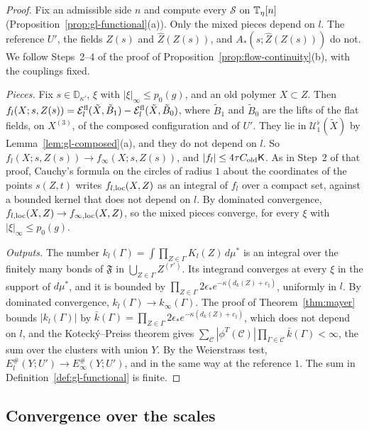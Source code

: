 \begin{proof}
Fix an admissible side $n$ and compute every $\mathscr S$ on $\mathbb T_\eta[n]$ (Proposition~\ref{prop:gl-functional}(a)). Only the mixed pieces depend on $l$. The reference $U'$, the fields $Z(s)$ and $\hat Z(Z(s))$, and $A_*(s;\hat Z(Z(s)))$ do not. We follow Steps~2--4 of the proof of Proposition~\ref{prop:flow-continuity}(b), with the couplings fixed.

\emph{Pieces.} Fix $s\in\mathbb D_{\kappa'}$, $\xi$ with $|\xi|_\infty\le p_0(g)$, and an old polymer $X\subset Z$. Then $f_l(X;s,Z(s))=\mathcal E^{\rm fl}_l(\tilde X,\tilde B_1)-\mathcal E^{\rm fl}_l(\tilde X,\tilde B_0)$, where $\tilde B_1$ and $\tilde B_0$ are the lifts of the flat fields, on $X^{(3)}$, of the composed configuration and of $U'$. They lie in $\mathcal U^\flat_1(\tilde X)$ by Lemma~\ref{lem:gl-composed}(a), and they do not depend on $l$. So $f_l(X;s,Z(s))\to f_\infty(X;s,Z(s))$, and $|f_l|\le4\tau C_{\rm old}\mathsf K$. As in Step~2 of that proof, Cauchy's formula on the circles of radius $1$ about the coordinates of the points $s(Z,t)$ writes $f_{l,\rm loc}(X,Z)$ as an integral of $f_l$ over a compact set, against a bounded kernel that does not depend on $l$. By dominated convergence, $f_{l,\rm loc}(X,Z)\to f_{\infty,\rm loc}(X,Z)$, so the mixed pieces converge, for every $\xi$ with $|\xi|_\infty\le p_0(g)$.

\emph{Outputs.} The number $k_l(\Gamma)=\int\prod_{Z\in\Gamma}K_l(Z)\,d\mu^*$ is an integral over the finitely many bonds of $\mathfrak F$ in $\bigcup_{Z\in\Gamma}Z^{(r')}$. Its integrand converges at every $\xi$ in the support of $d\mu^*$, and it is bounded by $\prod_{Z\in\Gamma}2\epsilon_*e^{-\kappa(d_k(Z)+c_\natural)}$, uniformly in $l$. By dominated convergence, $k_l(\Gamma)\to k_\infty(\Gamma)$. The proof of Theorem~\ref{thm:mayer} bounds $|k_l(\Gamma)|$ by $\bar k(\Gamma)=\prod_{Z\in\Gamma}2\epsilon_*e^{-\kappa(d_k(Z)+c_\natural)}$, which does not depend on $l$, and the Koteck\'y--Preiss theorem gives $\sum_{\mathcal C}|\phi^T(\mathcal C)|\prod_{\Gamma\in\mathcal C}\bar k(\Gamma)<\infty$, the sum over the clusters with union $Y$. By the Weierstrass test, $E^\#_l(Y;U')\to E^\#_\infty(Y;U')$, and in the same way at the reference $1$. The sum in Definition~\ref{def:gl-functional} is finite.
\end{proof}

\subsection{Convergence over the scales}\label{subsec:gl-induction}

